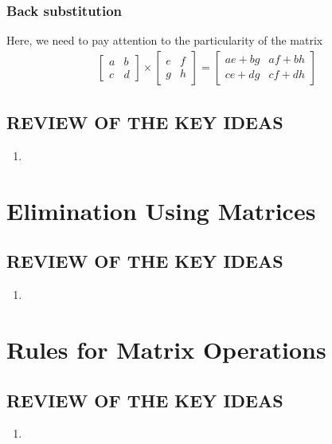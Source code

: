 \documentclass{book}
\begin{document}
    \subsubsection{Back substitution}
    Here, we need to pay attention to the particularity of the matrix
    \begin{align}
        \begin{bmatrix}
          a & b \\
          c & d
        \end{bmatrix}
        \times
        \begin{bmatrix}
          e & f \\
          g & h
        \end{bmatrix}
        =
        \begin{bmatrix}
          ae + bg & af + bh \\
          ce + dg & cf + dh
        \end{bmatrix}
      \end{align}
\subsection*{REVIEW OF THE KEY IDEAS}
    \begin{enumerate}
          \item  
    \end{enumerate}
   


\section{Elimination Using Matrices}
\subsection*{REVIEW OF THE KEY IDEAS}
    \begin{enumerate}
        \item  
    \end{enumerate}

\section{Rules for Matrix Operations}
\subsection*{REVIEW OF THE KEY IDEAS}
    \begin{enumerate}
        \item  
    \end{enumerate}
\end{document}

